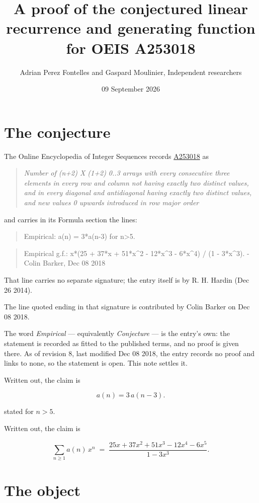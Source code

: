 \documentclass[11pt]{article}
\title{A proof of the conjectured linear recurrence and generating function for OEIS A253018}
\author{Adrian Perez Fontelles and Gaspard Moulinier, Independent researchers}
\date{09 September 2026}
\theoremstyle{definition}
\begin{document}
\maketitle
\section{The conjecture}

The Online Encyclopedia of Integer Sequences records \href{https://oeis.org/A253018}{A253018} as

\begin{quote}\itshape Number of (n+2) X (1+2) 0..3 arrays with every consecutive three elements in every row and column not having exactly two distinct values, and in every diagonal and antidiagonal having exactly two distinct values, and new values 0 upwards introduced in row major order\end{quote}

and carries in its Formula section the lines:

\begin{quote}\ttfamily Empirical: a(n) = 3*a(n-3) for n>5.\end{quote}

\begin{quote}\ttfamily Empirical g.f.: x*(25 + 37*x + 51*x\textasciicircum{}2 - 12*x\textasciicircum{}3 - 6*x\textasciicircum{}4) / (1 - 3*x\textasciicircum{}3). - Colin Barker, Dec 08 2018\end{quote}

That line carries no separate signature; the entry itself is by R. H. Hardin (Dec 26 2014).

The line quoted ending in that signature is contributed by Colin Barker on Dec 08 2018.

The word {\itshape Empirical} --- equivalently {\itshape Conjecture} --- is the entry's own: the statement is recorded as fitted to the published terms, and no proof is given there. As of revision 8, last modified Dec 08 2018, the entry records no proof and links to none, so the statement is open. This note settles it.

Written out, the claim is

\[a(n) = 3\,a(n-3).\]

stated for $n > 5$.

Written out, the claim is

\[\sum_{n \ge 1} a(n)\,x^n \;=\; \frac{25x + 37x^{2} + 51x^{3} - 12x^{4} - 6x^{5}}{1 - 3x^{3}}.\]

\section{The object}
\end{document}
